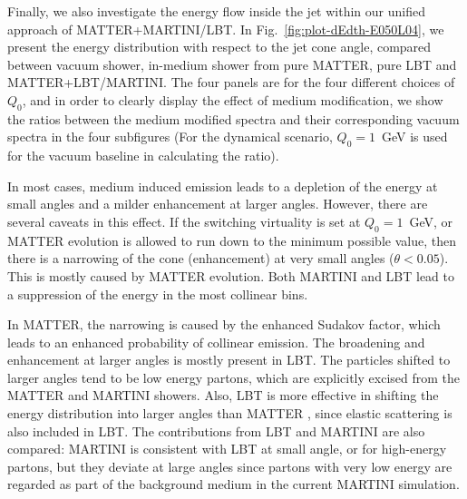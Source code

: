 \documentclass[aps,prc,twocolumn,floatfix,superscriptaddress,nofootinbib]{revtex4}
\begin{document}
Finally, we also investigate the energy flow inside the jet within our unified approach of MATTER+MARTINI/LBT. In Fig.~\ref{fig:plot-dEdth-E050L04}, we present the energy distribution with respect to the jet cone angle, compared between vacuum shower, in-medium shower from pure MATTER, pure LBT and MATTER+LBT/MARTINI. The four panels are for the four different choices of $Q_0$, and in order to clearly display the effect of medium modification, we show the ratios between the medium modified spectra and their corresponding vacuum spectra in the four subfigures (For the dynamical scenario, $Q_0=1$~GeV is used for the vacuum baseline in calculating the ratio). 

In most cases, medium induced emission leads to a depletion of the energy at small angles and a milder enhancement at larger angles. 
However, there are several caveats in this effect. If the switching virtuality is set at $Q_{0} = 1$~GeV, or MATTER evolution is allowed to run down to the minimum possible value, then there is a narrowing of the cone (enhancement) at very small angles ($\theta < 0.05$). This is mostly caused by MATTER evolution.  
Both MARTINI and LBT lead to a suppression of the energy in the most collinear bins. 


In MATTER, the narrowing is caused by the enhanced Sudakov factor, which leads to 
an enhanced probability of collinear emission. 
The broadening and enhancement at larger angles is mostly present in LBT. The particles shifted to larger angles tend to be low energy partons, which are explicitly excised from the MATTER and MARTINI showers. 
Also, LBT is more effective in shifting the energy distribution into larger angles than MATTER \cite{Majumder:2005sw}, since elastic scattering is also included in LBT. The contributions from LBT and MARTINI are also compared: MARTINI is consistent with LBT at small angle, or for high-energy partons, but they deviate at large angles since partons with very low energy are regarded as part of the background medium in the current MARTINI simulation. 
\end{document}
